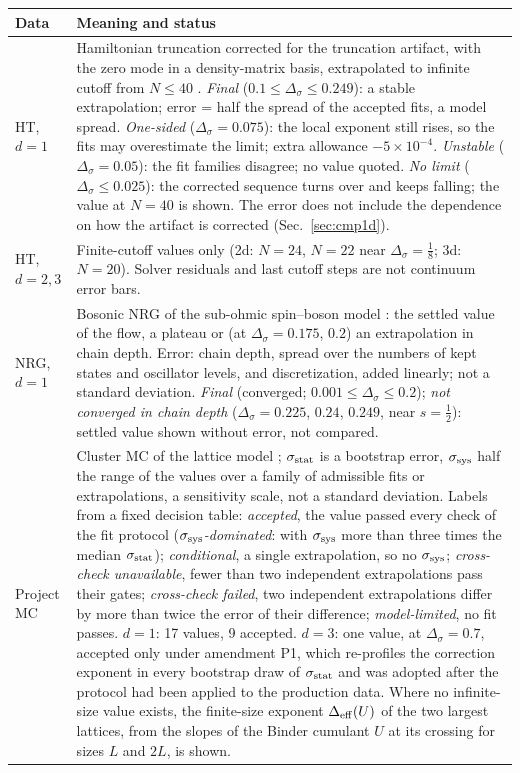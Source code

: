\documentclass[11pt,a4paper]{article}
\numberwithin{equation}{section}
\newcommand{\Ds}{\Delta_\sigma}
\newcommand{\sci}[2]{#1\times10^{#2}}
\begin{document}
\begin{table}[htbp]\centering\small
\begin{tabular}{@{}>{\raggedright\arraybackslash}p{}>{\raggedright\arraybackslash}p{}@{}}
\toprule
Data & Meaning and status\\ \midrule
HT, $d=1$ & Hamiltonian truncation corrected for the truncation artifact, with the zero mode in a density-matrix basis, extrapolated to infinite cutoff from $N\le40$ \cite{noteHT}. \emph{Final} ($0.1\le\Ds\le0.249$): a stable extrapolation; error = half the spread of the accepted fits, a model spread. \emph{One-sided} ($\Ds=0.075$): the local exponent still rises, so the fits may overestimate the limit; extra allowance $-\sci{5}{-4}$. \emph{Unstable} ($\Ds=0.05$): the fit families disagree; no value quoted. \emph{No limit} ($\Ds\le0.025$): the corrected sequence turns over and keeps falling; the value at $N=40$ is shown. The error does not include the dependence on how the artifact is corrected (Sec.~\ref{sec:cmp1d}).\\
HT, $d=2,3$ & Finite-cutoff values only \cite{noteHT} (2d: $N=24$, $N=22$ near $\Ds=\frac18$; 3d: $N=20$). Solver residuals and last cutoff steps are not continuum error bars.\\
NRG, $d=1$ & Bosonic NRG of the sub-ohmic spin--boson model \cite{noteNRG}: the settled value of the flow, a plateau or (at $\Ds=0.175$, $0.2$) an extrapolation in chain depth. Error: chain depth, spread over the numbers of kept states and oscillator levels, and discretization, added linearly; not a standard deviation. \emph{Final} (converged; $0.001\le\Ds\le0.2$); \emph{not converged in chain depth} ($\Ds=0.225$, $0.24$, $0.249$, near $s=\frac12$): settled value shown without error, not compared.\\
Project MC & Cluster MC of the lattice model \cite{noteMC}; $\sigma_{\rm stat}$ is a bootstrap error, $\sigma_{\rm sys}$ half the range of the values over a family of admissible fits or extrapolations, a sensitivity scale, not a standard deviation. Labels from a fixed decision table: \emph{accepted}, the value passed every check of the fit protocol (\emph{$\sigma_{\rm sys}$-dominated}: with $\sigma_{\rm sys}$ more than three times the median $\sigma_{\rm stat}$); \emph{conditional}, a single extrapolation, so no $\sigma_{\rm sys}$; \emph{cross-check unavailable}, fewer than two independent extrapolations pass their gates; \emph{cross-check failed}, two independent extrapolations differ by more than twice the error of their difference; \emph{model-limited}, no fit passes. $d=1$: 17 values, 9 accepted. $d=3$: one value, at $\Ds=0.7$, accepted only under amendment P1, which re-profiles the correction exponent in every bootstrap draw of $\sigma_{\rm stat}$ and was adopted after the protocol had been applied to the production data. Where no infinite-size value exists, the finite-size exponent $\Delta_{\rm eff}(U)$ of the two largest lattices, from the slopes of the Binder cumulant $U$ at its crossing for sizes $L$ and $2L$, is shown.\\

\end{tabular}
\end{table}
\end{document}
